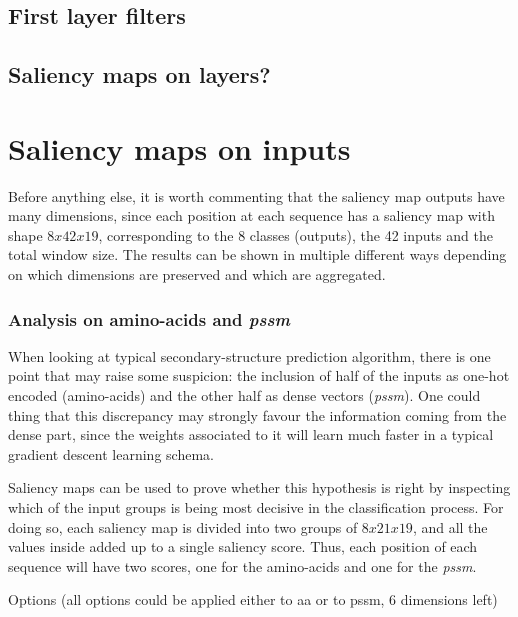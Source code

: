 	\subsection{First layer filters}
	
	\subsection{Saliency maps on layers?}


\section{Saliency maps on inputs}

Before anything else, it is worth commenting that the saliency map outputs have many dimensions, since each position at each sequence has a saliency map with shape $8x42x19$, corresponding to the 8 classes (outputs), the 42 inputs and the total window size. The results can be shown in multiple different ways depending on which dimensions are preserved and which are aggregated. 


\subsubsection*{Analysis on amino-acids and \textit{pssm}}
When looking at typical secondary-structure prediction algorithm, there is one point that may raise some suspicion: the inclusion of half of the inputs as one-hot encoded (amino-acids) and the other half as dense vectors (\textit{pssm}). One could thing that this discrepancy may strongly favour the information coming from the dense part, since the weights associated to it will learn much faster in a typical gradient descent learning schema.

Saliency maps can be used to prove whether this hypothesis is right by inspecting which of the input groups is being most decisive in the classification process. For doing so, each saliency map is divided into two groups of $8x21x19$, and all the values inside added up to a single saliency score. Thus, each position of each sequence will have two scores, one for the amino-acids and one for the \textit{pssm}.


Options (all options could be applied either to aa or to pssm, 6 dimensions left)
	
